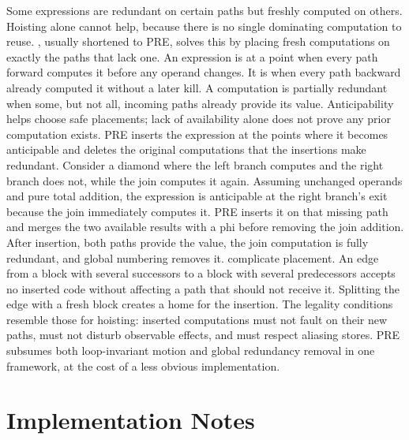 Some expressions are redundant on certain paths but freshly computed on others.
Hoisting alone cannot help, because there is no single dominating computation to reuse.
, usually shortened to PRE, solves this by placing fresh computations on exactly the paths that lack one.
An expression is  at a point when every path forward computes it before any operand changes.
It is  when every path backward already computed it without a later kill.
A computation is partially redundant when some, but not all, incoming paths already provide its value.
Anticipability helps choose safe placements; lack of availability alone does not prove any prior computation exists.
PRE inserts the expression at the points where it becomes anticipable and deletes the original computations that the insertions make redundant.
Consider a diamond where the left branch computes  and the right branch does not, while the join computes it again.
Assuming unchanged operands and pure total addition, the expression is anticipable at the right branch's exit because the join immediately computes it.
PRE inserts it on that missing path and merges the two available results with a phi before removing the join addition.
After insertion, both paths provide the value, the join computation is fully redundant, and global numbering removes it.
 complicate placement.
An edge from a block with several successors to a block with several predecessors accepts no inserted code without affecting a path that should not receive it.
Splitting the edge with a fresh block creates a home for the insertion.
The legality conditions resemble those for hoisting: inserted computations must not fault on their new paths, must not disturb observable effects, and must respect aliasing stores.
PRE subsumes both loop-invariant motion and global redundancy removal in one framework, at the cost of a less obvious implementation.

\section{Implementation Notes}
\label{sec:ch17-implementation}


